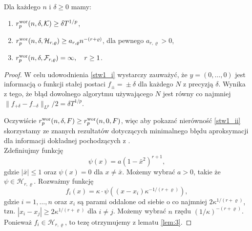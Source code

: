 \documentclass[oik, pdftex, man]{mgrwms}
\begin{document}
    \begin{stw} \label{stw1}
        Dla każdego $n$ i $\delta \geq 0$ mamy:
        \begin{enumerate}[label=(\roman*)]
            \item \label{stw1_i} $r^{\mathrm{wor}}_{p}(n, \delta, \mathcal{K}) \geq \delta T^{1/p}$,
            \item \label{stw1_ii} $r^{\mathrm{wor}}_{p}(n, \delta, \mathcal{H}_{r,\varrho}) \geq a_{r,\varrho}n^{-(r + \varrho)}$, dla pewnego $a_{r,\varrho} > 0$,
            \item \label{stw1_iii} $r^{\mathrm{wor}}_{p}(n, \delta, \mathcal{F}_{r,\varrho}) = \infty, \quad r \geq 1$.
        \end{enumerate}
    \end{stw}
    \begin{proof}
        W celu udowodnienia \ref{stw1_i} wystarczy zauważyć, że $y = (0, \ldots, 0)$ jest informacją o funkcji stałej postaci $f_{\pm} \!=\! \pm \delta$ dla każdego $N$ z precyzją $\delta$. Wynika z tego, że błąd dowolnego algorytmu używającego $N$ jest równy co najmniej $\| f_{+\delta} - f_{-\delta} \|_{L^{p}} / 2 = \delta T^{1/p}$.

        Oczywiście $r^{\mathrm{wor}}_{p}(n, \delta, F) \geq r^{\mathrm{wor}}_{p}(n, 0, F)$, więc aby pokazać nierówność \ref{stw1_ii} skorzystamy ze znanych rezultatów dotyczących minimalnego błędu aproksymacji dla informacji dokładnej pochodzących z \cite{DaS}. \\
        Zdefiniujmy funkcję
        \begin{equation*}
            \psi(x) = a (1 - \bar{x}^{2})^{r+1},
        \end{equation*}
        gdzie $|\bar{x}| \leq 1$ oraz $\psi(x) = 0$ dla $x \neq \bar{x}$. Możemy wybrać $a > 0$, takie że $\psi \in \mathcal{H}_{r,\varrho}$.
        Rozważmy funkcję
        \begin{equation*}
            f_{i}(x) = \kappa \cdot \psi \left( (x-x_{i}) \kappa^{-1 / (r+\varrho)} \right),
        \end{equation*}
        gdzie $i = 1, \ldots, n$ oraz $x_{i}$ są parami oddalone od siebie o co najmniej $2\kappa^{1/(r+\varrho)}$, tzn. $|x_{i} - x_{j}| \geq 2\kappa^{1/(r+\varrho)}$ dla $i \neq j$. Możemy wybrać $n$ rzędu $(1/\kappa)^{-(r + \varrho)}$. Ponieważ $f_{i} \in \mathcal{H}_{r,\varrho}$, to tezę otrzymujemy z lematu \ref{lem:3}.



\end{proof}
\end{document}
